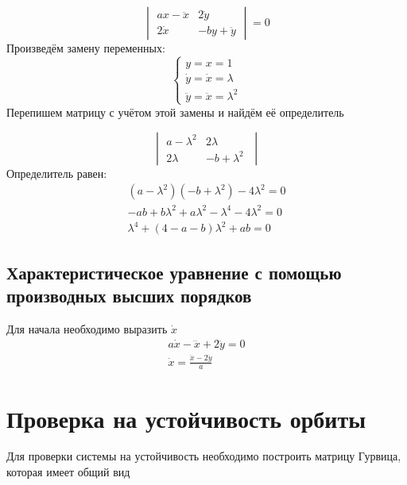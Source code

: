 \documentclass[12pt, a4paper]{article}
\begin{document}
\begin{displaymath}
    \begin{vmatrix}
        ax - \ddot x & 2 \dot y\\
        2 \dot x & - by + \ddot y
    \end{vmatrix}
    = 0 
\end{displaymath}
Произведём замену переменных: 
\begin{displaymath}
    \begin{cases}
        y = x = 1 \\
        \dot y = \dot x = \lambda \\
        \ddot y = \ddot x = \lambda^2
    \end{cases}
\end{displaymath}
Перепишем матрицу с учётом этой замены и найдём её определитель

\begin{displaymath}
    \begin{vmatrix}
        a - \lambda^2 & 2 \lambda\;\\
        2 \lambda & - b + \lambda^2\;
    \end{vmatrix}
\end{displaymath}
Определитель равен:
\begin{align*}
   (a - \lambda^2)(- b + \lambda^2) - 4 \lambda^2 = 0\\
    - ab + b \lambda^2 + a \lambda^2 - \lambda^4 - 4 \lambda^2 = 0\\
    \boxed{
    \lambda^4 + (4 - a - b) \lambda^2 + ab = 0
    }
\end{align*}

\subsection{Характеристическое уравнение с помощью производных высших порядков}

Для начала необходимо выразить $\dot x$
\begin{gather*}
    a \dot x - \dddot x + 2 \ddot y = 0\\
    \dot x = \frac{\dddot x - 2 \ddot y}{a}
\end{gather*}

\section{Проверка на устойчивость орбиты}

Для проверки системы на устойчивость необходимо построить матрицу Гурвица, которая имеет общий вид
\end{document}

